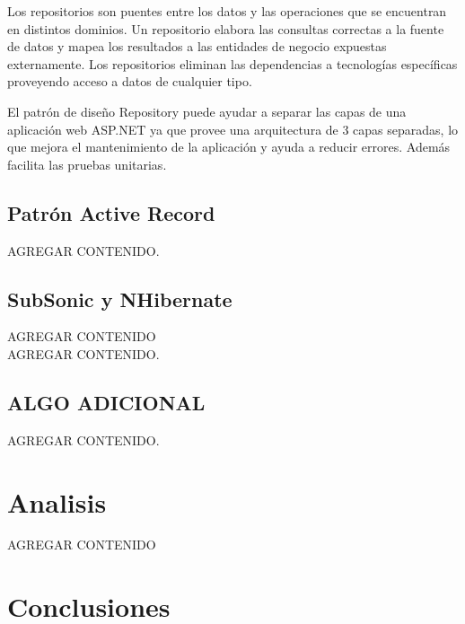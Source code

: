 \documentclass[preprint,12pt]{elsarticle}
\begin{document}
Los repositorios son puentes entre los datos y las operaciones que se encuentran en distintos dominios. Un repositorio elabora las consultas correctas a la fuente de datos y mapea los resultados a las entidades de negocio expuestas externamente. Los repositorios eliminan las dependencias a tecnologías específicas proveyendo acceso a datos de cualquier tipo.\cite{referenciaQuispe1}

El patrón de diseño Repository puede ayudar a separar las capas de una aplicación web ASP.NET ya que provee una arquitectura de 3 capas separadas, lo que mejora el mantenimiento de la aplicación y ayuda a reducir errores. Además facilita las pruebas unitarias.

\subsection{Patrón Active Record}
AGREGAR CONTENIDO.\cite{referenciaQuispe1}

\subsection{SubSonic y NHibernate}
AGREGAR CONTENIDO\cite{referenciaQuispe2}
\\
AGREGAR CONTENIDO.\cite{referenciarobles2}



\subsection{ALGO ADICIONAL}

AGREGAR CONTENIDO.\cite{referenciaporlles1}




\section{Analisis}

AGREGAR CONTENIDO



\section{Conclusiones}
\end{document}
